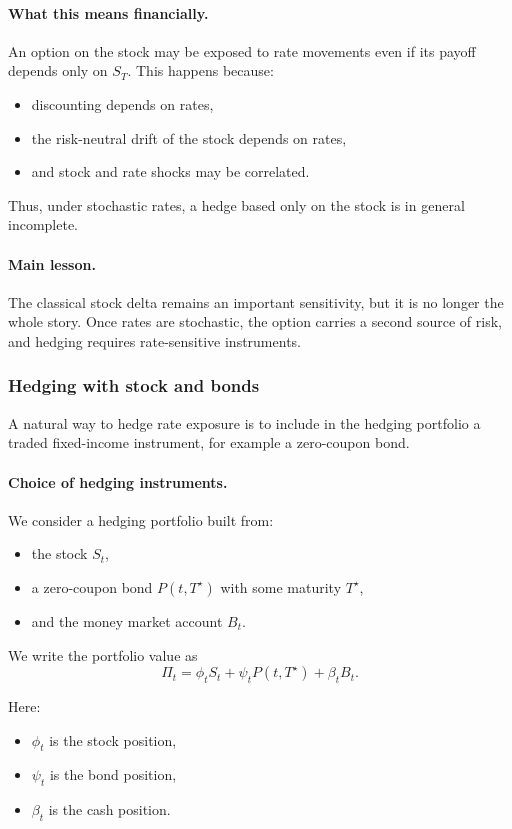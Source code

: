 \documentclass[11pt]{article}
\theoremstyle{plain}
\theoremstyle{definition}
\theoremstyle{remark}
\begin{document}
\paragraph{What this means financially.}
An option on the stock may be exposed to rate movements even if its
payoff depends only on \(S_T\).
This happens because:
\begin{itemize}[leftmargin=1.4em]
    \item discounting depends on rates,
    \item the risk-neutral drift of the stock depends on rates,
    \item and stock and rate shocks may be correlated.
\end{itemize}

Thus, under stochastic rates, a hedge based only on the stock is in
general incomplete.

\paragraph{Main lesson.}
The classical stock delta remains an important sensitivity, but it is no
longer the whole story.
Once rates are stochastic, the option carries a second source of risk,
and hedging requires rate-sensitive instruments.

\subsubsection{Hedging with stock and bonds}

A natural way to hedge rate exposure is to include in the hedging
portfolio a traded fixed-income instrument, for example a zero-coupon
bond.

\paragraph{Choice of hedging instruments.}
We consider a hedging portfolio built from:
\begin{itemize}[leftmargin=1.4em]
    \item the stock \(S_t\),
    \item a zero-coupon bond \(P(t,T^\star)\) with some maturity
    \(T^\star\),
    \item and the money market account \(B_t\).
\end{itemize}

We write the portfolio value as
\[
\Pi_t=\phi_t S_t+\psi_t P(t,T^\star)+\beta_t B_t.
\]

Here:
\begin{itemize}[leftmargin=1.4em]
    \item \(\phi_t\) is the stock position,
    \item \(\psi_t\) is the bond position,
    \item \(\beta_t\) is the cash position.
\end{itemize}
\end{document}
